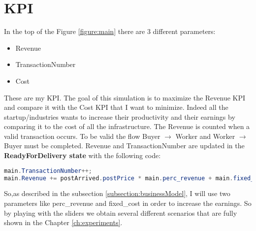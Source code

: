 \chapter{KPI}\label{ch:KPI}
In the top of the Figure \ref{figure:main} there are 3 different parameters:
\begin{itemize}
\item Revenue
\item TransactionNumber
\item Cost
\end{itemize}
These are my KPI. The goal of this simulation is to maximize the Revenue KPI and compare it with the Cost KPI that I want to minimize. Indeed all the startup/industries wants to increase their productivity and their earnings by comparing it to the cost of all the infrastructure. 
The Revenue is counted when a valid transaction occurs. To be valid the flow Buyer $\rightarrow$ Worker and Worker $\rightarrow$ Buyer must be completed. Revenue and TransactionNumber are updated in the \textbf{ReadyForDelivery state} with the following code: 
\begin{lstlisting}[language=Java]
main.TransactionNumber++;
main.Revenue += postArrived.postPrice * main.perc_revenue + main.fixed_cost;
\end{lstlisting}
So,as described in the subsection \ref{subsection:businessModel}, I will use two parameters like perc\_revenue and  fixed\_cost in order to increase the earnings. So by playing with the sliders we obtain several different scenarios that are fully shown in the Chapter \ref{ch:experiments}.